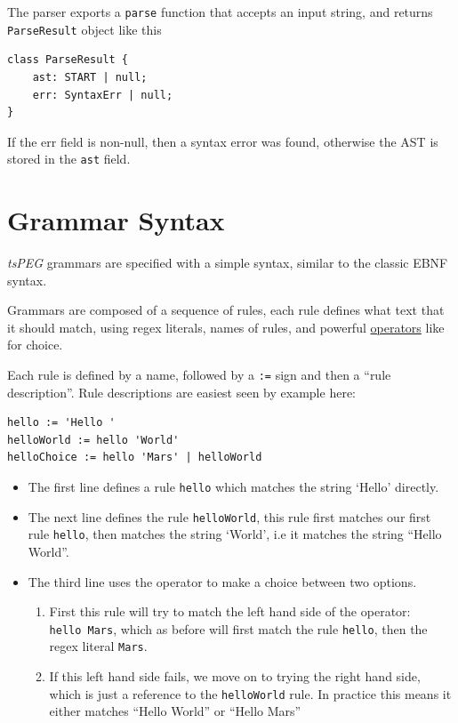 The parser exports a \texttt{parse} function that accepts an input
string, and returns \texttt{ParseResult} object like this

\begin{verbatim}
class ParseResult {
    ast: START | null;
    err: SyntaxErr | null;
}
\end{verbatim}

If the err field is non-null, then a syntax error was found, otherwise
the AST is stored in the \texttt{ast} field.

\section{Grammar Syntax}\label{grammar-syntax}

\emph{tsPEG} grammars are specified with a simple syntax, similar to the
classic EBNF syntax.

Grammars are composed of a sequence of rules, each rule defines what
text that it should match, using regex literals, names of rules, and
powerful \protect\hyperlink{operators}{operators} like
\texttt{\textbar{}} for choice.

Each rule is defined by a name, followed by a \texttt{:=} sign and then
a ``rule description''. Rule descriptions are easiest seen by example
here:

\begin{verbatim}
hello := 'Hello '
helloWorld := hello 'World'
helloChoice := hello 'Mars' | helloWorld
\end{verbatim}

\begin{itemize}

\item
  The first line defines a rule \texttt{hello} which matches the string
  `Hello' directly.
\item
  The next line defines the rule \texttt{helloWorld}, this rule first
  matches our first rule \texttt{hello}, then matches the string
  `World', i.e it matches the string ``Hello World''.
\item
  The third line uses the \texttt{\textbar{}} operator to make a choice
  between two options.

  \begin{enumerate}
  \def\labelenumi{\arabic{enumi}.}

  \item
    First this rule will try to match the left hand side of the
    operator: \texttt{hello\ \textquotesingle{}Mars\textquotesingle{}},
    which as before will first match the rule \texttt{hello}, then the
    regex literal \texttt{Mars}.
  \item
    If this left hand side fails, we move on to trying the right hand
    side, which is just a reference to the \texttt{helloWorld} rule. In
    practice this means it either matches ``Hello World'' or ``Hello
    Mars''
  \end{enumerate}
\end{itemize}

